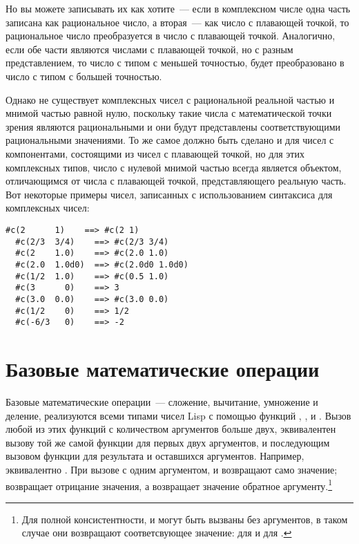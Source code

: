 Но вы можете записывать их как хотите~--- если в комплексном числе одна часть записана как
рациональное число, а вторая~--- как число с плавающей точкой, то рациональное число
преобразуется в число с плавающей точкой.  Аналогично, если обе части являются числами с
плавающей точкой, но с разным представлением, то число с типом с меньшей точностью, будет
преобразовано в число с типом с большей точностью.

Однако не существует комплексных чисел с рациональной реальной частью и мнимой частью
равной нулю, поскольку такие числа с математической точки зрения являются рациональными и
они будут представлены соответствующими рациональными значениями. То же самое должно быть
сделано и для чисел с компонентами, состоящими из чисел с плавающей точкой, но для этих
комплексных типов, число с нулевой мнимой частью всегда является объектом, отличающимся от
числа с плавающей точкой, представляющего реальную часть.  Вот некоторые примеры чисел,
записанных с использованием синтаксиса для комплексных чисел:

\begin{lstlisting}[style=lisprepl]
  #c(2      1)    ==> #c(2 1)
  #c(2/3  3/4)    ==> #c(2/3 3/4)
  #c(2    1.0)    ==> #c(2.0 1.0)
  #c(2.0  1.0d0)  ==> #c(2.0d0 1.0d0)
  #c(1/2  1.0)    ==> #c(0.5 1.0)
  #c(3      0)    ==> 3
  #c(3.0  0.0)    ==> #c(3.0 0.0)
  #c(1/2    0)    ==> 1/2
  #c(-6/3   0)    ==> -2
\end{lstlisting}

\section{Базовые математические операции}

Базовые математические операции~--- сложение, вычитание, умножение и деление, реализуются
всеми типами чисел Lisp с помощью функций \code{+}, \code{-}, \code{*} и \code{/}.  Вызов
любой из этих функций с количеством аргументов больше двух, эквивалентен вызову той же
самой функции для первых двух аргументов, и последующим вызовом функции для результата и
оставшихся аргументов.  Например,  эквивалентно .  При
вызове с одним аргументом, \code{+} и \code{*} возвращают само значение; \code{-}
возвращает отрицание значения, а \code{/} возвращает значение обратное
аргументу.\footnote{Для полной консистентности, \code{+} и \code{*} могут быть вызваны без
  аргументов, в таком случае они возвращают соответсвующее значение:  для \code{+}
  и  для \code{*}.}

